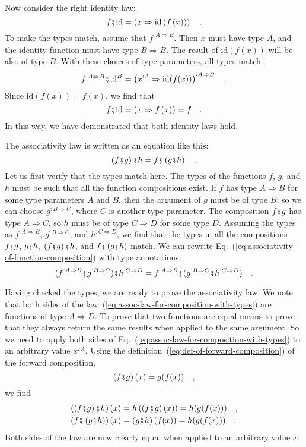 Now consider the right identity law:
\[
f\bef\text{id}=\left(x\Rightarrow\text{id}\left(f\left(x\right)\right)\right)\quad.
\]
To make the types match, assume that $f^{:A\Rightarrow B}$. Then
$x$ must have type $A$, and the identity function must have type
$B\Rightarrow B$. The result of $\text{id}\left(f\left(x\right)\right)$
will be also of type $B$. With these choices of type parameters,
all types match:
\[
f^{:A\Rightarrow B}\bef\text{id}^{B}=\left(x^{:A}\Rightarrow\text{id}(f(x))\right)^{:A\Rightarrow B}\quad.
\]
Since $\text{id}(f(x))=f(x)$, we find that 
\[
f\bef\text{id}=\left(x\Rightarrow f\left(x\right)\right)=f\quad.
\]
In this way, we have demonstrated that both identity laws hold. 

The associativity law is written as an equation like this:
\begin{equation}
\left(f\bef g\right)\bef h=f\bef\left(g\bef h\right)\quad.\label{eq:associativity-of-function-composition}
\end{equation}
Let us first verify that the types match here. The types of the functions
$f$, $g$, and $h$ must be such that all the function compositions
exist. If $f$ has type $A\Rightarrow B$ for some type parameters
$A$ and $B$, then the argument of $g$ must be of type $B$; so
we can choose $g^{:B\Rightarrow C}$, where $C$ is another type parameter.
The composition $f\bef g$ has type $A\Rightarrow C$, so $h$ must
be of type $C\Rightarrow D$ for some type $D$. Assuming the types
as $f^{:A\Rightarrow B}$, $g^{:B\Rightarrow C}$, and $h^{:C\Rightarrow D}$,
we find that the types in all the compositions $f\bef g$, $g\bef h$,
$\left(f\bef g\right)\bef h$, and $f\bef\left(g\bef h\right)$ match.
We can rewrite Eq.~(\ref{eq:associativity-of-function-composition})
with type annotations, 
\begin{equation}
(f^{:A\Rightarrow B}\bef g^{:B\Rightarrow C})\bef h^{:C\Rightarrow D}=f^{:A\Rightarrow B}\bef(g^{:B\Rightarrow C}\bef h^{:C\Rightarrow D})\quad.\label{eq:assoc-law-for-composition-with-types}
\end{equation}

Having checked the types, we are ready to prove the associativity
law. We note that both sides of the law~(\ref{eq:assoc-law-for-composition-with-types})
are functions of type $A\Rightarrow D$. To prove that two functions
are equal means to prove that they always return the same results
when applied to the same argument. So we need to apply both sides
of Eq.~(\ref{eq:assoc-law-for-composition-with-types}) to an arbitrary
value $x^{:A}$. Using the definition~(\ref{eq:def-of-forward-composition})
of the forward composition, 
\[
\left(f\bef g\right)(x)=g(f(x))\quad,
\]
we find
\begin{align*}
\left(\left(f\bef g\right)\bef h\right)(x) & =h\left(\left(f\bef g\right)(x)\right)=h(g(f(x)))\quad,\\
\left(f\bef\left(g\bef h\right)\right)(x) & =\left(g\bef h\right)(f(x))=h(g(f(x)))\quad.
\end{align*}
Both sides of the law are now clearly equal when applied to an arbitrary
value $x$.

